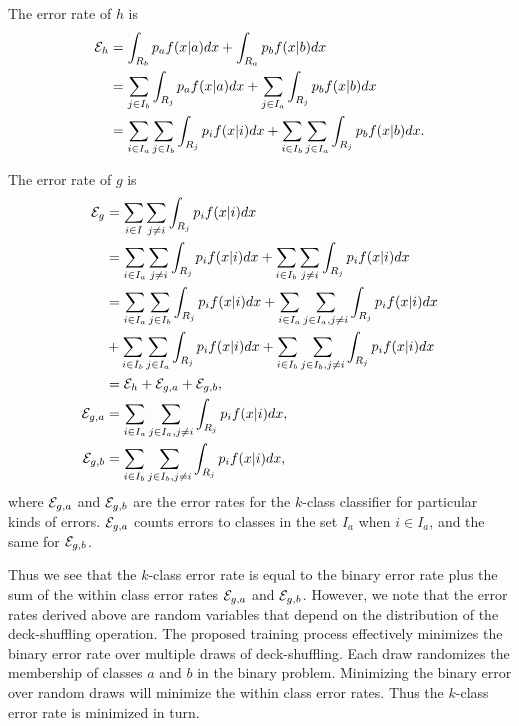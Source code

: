 \documentclass{article}
\begin{document}
The error rate of $h$ is
\begin{align*}
{\cal E}_h &= \int_{R_b} p_a f(x|a) dx + \int_{R_a} p_b f(x|b) dx \\
&= \sum_{j \in I_b} \int_{R_j} p_a f(x|a) dx + \sum_{j\in I_a} \int_{R_j} p_b f(x|b) dx \\
&= \sum_{i \in I_a} \sum_{j \in I_b} \int_{R_j} p_i f(x|i) dx + \sum_{i \in I_b} \sum_{j \in I_a} \int_{R_j} p_b f(x|b) dx.
\end{align*}

The error rate of $g$ is
\begin{align*}
{\cal E}_g &= \sum_{i \in I} \sum_{j\neq i} \int_{R_j} p_i f(x|i) dx \\
&= \sum_{i \in I_a} \sum_{j \neq i} \int_{R_j} p_i f(x|i) dx + \sum_{i \in I_b} \sum_{j \neq i} \int_{R_j} p_i f(x|i) dx\\
&= \sum_{i \in I_a} \sum_{j \in I_b} \int_{R_j} p_i f(x|i) dx + \sum_{i \in I_a} \sum_{j \in I_a, j\neq i} \int_{R_j} p_i f(x|i) dx \\
&+ \sum_{i \in I_b} \sum_{j \in I_a} \int_{R_j} p_i f(x|i) dx + \sum_{i \in I_b} \sum_{j \in I_b, j\neq i} \int_{R_j} p_i f(x|i) dx\\
&= {\cal E}_h + {\cal E}_{g,a} + {\cal E}_{g,b}, \\
{\cal E}_{g,a} &= \sum_{i \in I_a} \sum_{j \in I_a, j\neq i} \int_{R_j} p_i f(x|i) dx,\\
{\cal E}_{g,b} &= \sum_{i \in I_b} \sum_{j \in I_b, j\neq i} \int_{R_j} p_i f(x|i) dx,
\end{align*}
where ${\cal E}_{g,a}$ and ${\cal E}_{g,b}$ are the error rates for the $k$-class classifier for particular kinds of errors.  ${\cal E}_{g,a}$ counts errors to classes in the set $I_a$ when $i \in I_a$, and the same for ${\cal E}_{g,b}$.  

Thus we see that the $k$-class error rate is equal to the binary error rate plus the sum of the within class error rates ${\cal E}_{g,a}$ and ${\cal E}_{g,b}$.  However, we note that the error rates derived above are random variables that depend on the distribution of the deck-shuffling operation.  The proposed training process effectively minimizes the binary error rate over multiple draws of deck-shuffling.  Each draw randomizes the membership of classes $a$ and $b$ in the binary problem.  Minimizing the binary error over random draws will minimize the within class error rates.  Thus the $k$-class error rate is minimized in turn.
\end{document}
